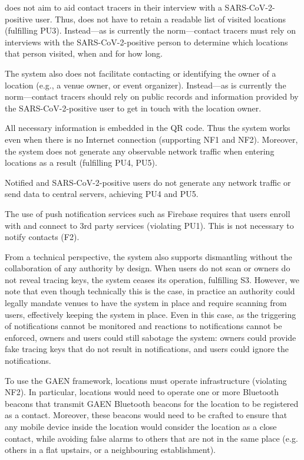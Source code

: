  \name does not aim to aid contact tracers in their interview with a SARS-CoV-2-positive user. Thus, \name does not have to retain a readable list of visited locations (fulfilling PU3). Instead---as is currently the norm---contact tracers must rely on interviews with the SARS-CoV-2-positive person to determine which locations that person visited, when and for how long.


The system also does not facilitate contacting or identifying the owner of a location (e.g., a venue owner, or event organizer). Instead---as is currently the norm---contact tracers should rely on public records and information provided by the SARS-CoV-2-positive user to get in touch with the location owner.

 All necessary information is embedded in the QR code. Thus the system works even when there is no Internet connection (supporting NF1 and NF2). Moreover, the system does not generate any observable network traffic when entering locations as a result (fulfilling PU4, PU5).

 Notified and SARS-CoV-2-positive users do not generate any network traffic or send data to central servers, achieving PU4 and PU5.

 The use of push notification services such as Firebase requires that users enroll with and connect to 3rd party services (violating PU1). This is not necessary to notify contacts (F2).

 From a technical perspective, the system also supports dismantling without the collaboration of any authority by design. When users do not scan or owners do not reveal tracing keys, the system ceases its operation, fulfilling S3. However, we note that even though technically this is the case, in practice an authority could legally mandate venues to have the system in place and require scanning from users, effectively keeping the system in place. Even in this case, as the triggering of notifications cannot be monitored and reactions to notifications cannot be enforced, owners and users could still sabotage the system: owners could provide fake tracing keys that do not result in notifications, and users could ignore the notifications.

 To use the GAEN framework, locations must operate infrastructure (violating NF2). In particular, locations would need to operate one or more Bluetooth beacons that transmit GAEN Bluetooth beacons for the location to be registered as a contact. Moreover, these beacons would need to be crafted to ensure that any mobile device inside the location would consider the location as a close contact, while avoiding false alarms to others that are not in the same place (e.g. others in a flat upstairs, or a neighbouring establishment).

